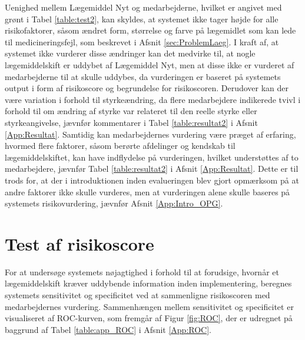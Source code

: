 Uenighed mellem Lægemiddel Nyt og medarbejderne, hvilket er angivet med grønt i Tabel \ref{table:test2}, kan skyldes, at systemet ikke tager højde for alle risikofaktorer, såsom ændret form, størrelse og farve på lægemidlet som kan lede til medicineringsfejl, som beskrevet i Afsnit \ref{sec:ProblemLaeg}. I kraft af, at systemet ikke vurderer disse ændringer kan det medvirke til, at nogle lægemiddelskift er uddybet af Lægemiddel Nyt, men at disse ikke er vurderet af medarbejderne til at skulle uddybes, da vurderingen er baseret på systemets output i form af risikoscore og begrundelse for risikoscoren. Derudover kan der være variation i forhold til styrkeændring, da flere medarbejdere indikerede tvivl i forhold til om ændring af styrke var relateret til den reelle styrke eller styrkeangivelse, jævnfør kommentarer i Tabel \ref{table:resultat2} i Afsnit \ref{App:Resultat}. Samtidig kan medarbejdernes vurdering være præget af erfaring, hvormed flere faktorer, såsom berørte afdelinger og kendskab til lægemiddelskiftet, kan have indflydelse på vurderingen, hvilket understøttes af to medarbejdere, jævnfør Tabel \ref{table:resultat2} i Afsnit \ref{App:Resultat}. Dette er til trods for, at der i introduktionen inden evalueringen blev gjort opmærksom på at andre faktorer ikke skulle vurderes, men at vurderingen alene skulle baseres på systemets risikovurdering, jævnfør Afsnit \ref{App:Intro_OPG}. 

\section{Test af risikoscore}
For at undersøge systemets nøjagtighed i forhold til at forudsige, hvornår et lægemiddelskift kræver uddybende information inden implementering, beregnes systemets sensitivitet og specificitet ved at sammenligne risikoscoren med medarbejdernes vurdering. Sammenhængen mellem sensitivitet og specificitet er visualiseret af ROC-kurven, som fremgår af Figur \ref{fig:ROC}, der er udregnet på baggrund af Tabel \ref{table:app_ROC} i Afsnit \ref{App:ROC}. 

